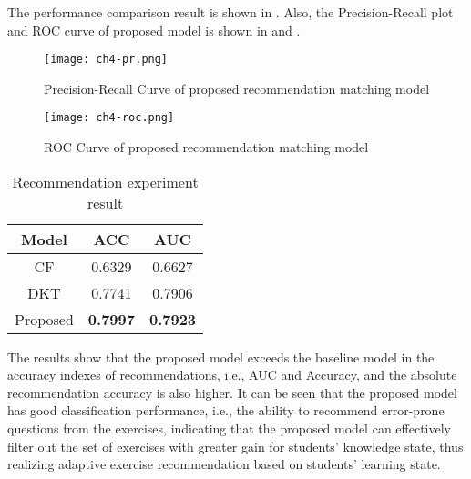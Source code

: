 The performance comparison result is shown in \tblname{\ref{tbl:ch4-exp-result}}. Also, the Precision-Recall plot and ROC curve of proposed model is shown in \figname{\ref{fig:ch4-pr-res}} and \figname{\ref{fig:ch4-roc-curve}}.
\begin{figure}[htb]
    \centering
    \texttt{[image: ch4-pr.png]}
    \caption{Precision-Recall Curve of proposed recommendation matching model}\label{fig:ch4-pr-res}
\end{figure}

\begin{figure}[htb]
    \centering
    \texttt{[image: ch4-roc.png]}
    \caption{ROC Curve of proposed recommendation matching model}\label{fig:ch4-roc-curve}
\end{figure}

\begin{table}[htb]
    \caption{Recommendation experiment result}\label{tbl:ch4-exp-result}
    \centering
    \begin{tabular}{cc c }
        \toprule
        Model    & ACC             & AUC             \\
        \midrule
        CF       & 0.6329          & 0.6627          \\
        DKT      & 0.7741          & 0.7906          \\
        \midrule
        Proposed & \textbf{0.7997} & \textbf{0.7923} \\
        \bottomrule
    \end{tabular}
\end{table}
The results show that the proposed model exceeds the baseline model in the accuracy indexes of recommendations, i.e., AUC and Accuracy, and the absolute recommendation accuracy is also higher. It can be seen that the proposed model has good classification performance, i.e., the ability to recommend error-prone questions from the exercises, indicating that the proposed model can effectively filter out the set of exercises with greater gain for students' knowledge state, thus realizing adaptive exercise recommendation based on students' learning state.



